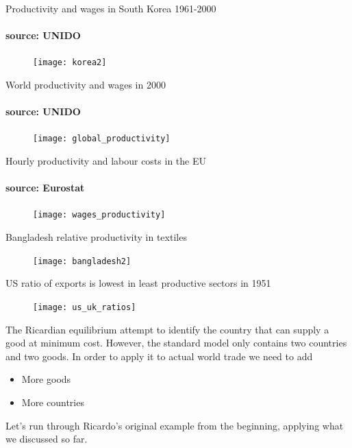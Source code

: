 \documentclass{beamer}
\begin{document}
\begin{frame}{Productivity and wages in South Korea 1961-2000}
\framesubtitle{source: UNIDO}
  \begin{figure}
    \texttt{[image: korea2]}
  \end{figure}  
\end{frame}

\begin{frame}{World productivity and wages in 2000}
\framesubtitle{source: UNIDO}
  \begin{figure}
    \texttt{[image: global\_productivity]}
  \end{figure}  
\end{frame}

\begin{frame}{Hourly productivity and labour costs in the EU}
\framesubtitle{source: Eurostat}
  \begin{figure}
    \texttt{[image: wages\_productivity]}
  \end{figure}  
\end{frame}

\begin{frame}{Bangladesh relative productivity in textiles}
  \begin{figure}
    \texttt{[image: bangladesh2]}
  \end{figure}  
\end{frame}

\begin{frame}{US ratio of exports is lowest in least productive sectors in 1951}
  \begin{figure}
    \texttt{[image: us\_uk\_ratios]}
  \end{figure}  
\end{frame}


\begin{frame}
  The Ricardian equilibrium attempt to identify the country that can supply a good at minimum cost. 
  However, the standard model only contains two countries and two goods. 
  In order to apply it to actual world trade we need to add
  \begin{itemize}
    \item More goods
    \item More countries
  \end{itemize}
  \medskip
  Let's run through Ricardo's original example from the beginning, applying what we discussed so far.
\end{frame}
\end{document}
